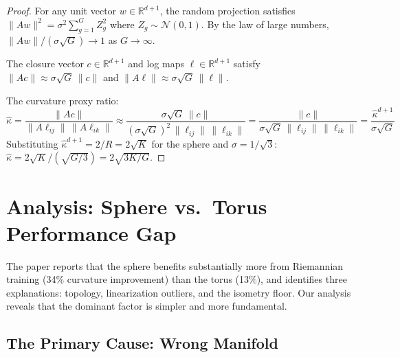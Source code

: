 \documentclass{article}
\newcommand{\RR}{\mathbb{R}}
\begin{document}
\begin{proof}
For any unit vector $w \in \RR^{d+1}$, the random projection satisfies
$\|Aw\|^2 = \sigma^2 \sum_{g=1}^G Z_g^2$ where $Z_g \sim \mathcal{N}(0,1)$.
By the law of large numbers, $\|Aw\|/(\sigma\sqrt{G}) \to 1$ as $G \to \infty$.

The closure vector $c \in \RR^{d+1}$ and log maps $\ell \in \RR^{d+1}$
satisfy $\|Ac\| \approx \sigma\sqrt{G}\,\|c\|$ and
$\|A\ell\| \approx \sigma\sqrt{G}\,\|\ell\|$.

The curvature proxy ratio:
\[
    \hat{\kappa} = \frac{\|Ac\|}{\|A\ell_{ij}\|\,\|A\ell_{ik}\|}
    \approx \frac{\sigma\sqrt{G}\,\|c\|}{(\sigma\sqrt{G})^2\,\|\ell_{ij}\|\,\|\ell_{ik}\|}
    = \frac{\|c\|}{\sigma\sqrt{G}\,\|\ell_{ij}\|\,\|\ell_{ik}\|}
    = \frac{\hat{\kappa}^{d+1}}{\sigma\sqrt{G}}
\]
Substituting $\hat{\kappa}^{d+1} = 2/R = 2\sqrt{K}$ for the sphere and
$\sigma = 1/\sqrt{3}$:
$\hat{\kappa} = 2\sqrt{K} / (\sqrt{G/3}) = 2\sqrt{3K/G}$.
\end{proof}


\section{Analysis: Sphere vs.\ Torus Performance Gap}
\label{sec:sphere_vs_torus}

The paper reports that the sphere benefits substantially more from Riemannian
training (34\% curvature improvement) than the torus (13\%), and identifies
three explanations: topology, linearization outliers, and the isometry floor.
Our analysis reveals that the dominant factor is simpler and more fundamental.

\subsection{The Primary Cause: Wrong Manifold}
\end{document}
